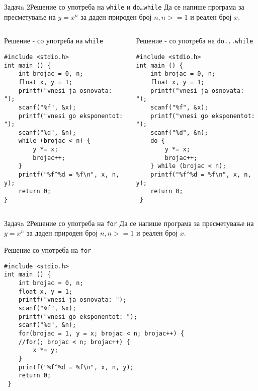 \begin{frame}[fragile]{Задачa 2}{Решение со употреба на \texttt{while} и
\texttt{do\ldots while}} Да се напише програма за пресметување на $y = x^n$ за
даден природен број $n, n>=1$ и реален број $x$.
\pause
\begin{columns}
\begin{exampleblock}{Решение - со употреба на \texttt{while}}
\begin{lstlisting}
#include <stdio.h> 
int main () { 
    int brojac = 0, n; 
    float x, y = 1; 
    printf("vnesi ja osnovata: "); 
    scanf("%f", &x); 
    printf("vnesi go eksponentot: "); 
    scanf("%d", &n);    
    while (brojac < n) { 
        y *= x; 
        brojac++; 
    } 
    printf("%f^%d = %f\n", x, n, y); 
    return 0; 
}
\end{lstlisting}
\end{exampleblock}
\pause
{}
\begin{exampleblock}{Решение - со употреба на \texttt{do...while}}
\begin{lstlisting}
#include <stdio.h> 
int main () { 
    int brojac = 0, n; 
    float x, y = 1; 
    printf("vnesi ja osnovata: "); 
    scanf("%f", &x); 
    printf("vnesi go eksponentot: "); 
    scanf("%d", &n); 
    do { 
        y *= x; 
        brojac++; 
    } while (brojac < n); 
    printf("%f^%d = %f\n", x, n, y); 
    return 0; 
 }
\end{lstlisting}
\end{exampleblock}
\end{columns}
\end{frame}

\begin{frame}[fragile]{Задачa 2}{Решение со употреба на \texttt{for}}
Да се напише програма за пресметување на $y = x^n$ за даден природен број $n,
n>=1$ и реален број $x$.
\pause
\begin{exampleblock}{Решение со употреба на \texttt{for}}
\begin{lstlisting}
#include <stdio.h> 
int main () { 
    int brojac = 0, n; 
    float x, y = 1; 
    printf("vnesi ja osnovata: "); 
    scanf("%f", &x); 
    printf("vnesi go eksponentot: "); 
    scanf("%d", &n); 
    for(brojac = 1, y = x; brojac < n; brojac++) {
    //for(; brojac < n; brojac++) {
    	x *= y;
    } 
    printf("%f^%d = %f\n", x, n, y); 
    return 0; 
 }
\end{lstlisting}
\end{exampleblock}
\end{frame}


